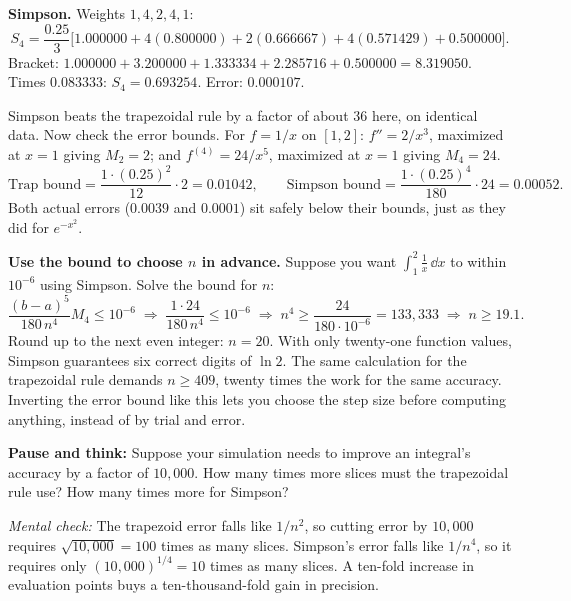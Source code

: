 \textbf{Simpson.} Weights $1,4,2,4,1$:
\[
S_4 = \frac{0.25}{3}\big[1.000000 + 4(0.800000) + 2(0.666667) + 4(0.571429) + 0.500000\big].
\]
Bracket: $1.000000 + 3.200000 + 1.333334 + 2.285716 + 0.500000 = 8.319050$. Times $0.083333$: $S_4 = 0.693254$. Error: $0.000107$.

Simpson beats the trapezoidal rule by a factor of about $36$ here, on identical data. Now check the error bounds. For $f = 1/x$ on $[1,2]$: $f'' = 2/x^3$, maximized at $x=1$ giving $M_2 = 2$; and $f^{(4)} = 24/x^5$, maximized at $x=1$ giving $M_4 = 24$.
\[
\text{Trap bound} = \frac{1\cdot(0.25)^2}{12}\cdot 2 = 0.01042,\qquad
\text{Simpson bound} = \frac{1\cdot(0.25)^4}{180}\cdot 24 = 0.00052.
\]
Both actual errors ($0.0039$ and $0.0001$) sit safely below their bounds, just as they did for $e^{-x^2}$.

\begin{labbox}
\textbf{Use the bound to choose $n$ in advance.} Suppose you want $\int_1^2 \tfrac1x\,\dd x$ to within $10^{-6}$ using Simpson. Solve the bound for $n$:
\[
\frac{(b-a)^5}{180\,n^4}M_4 \le 10^{-6}
\;\Longrightarrow\;
\frac{1\cdot 24}{180\,n^4} \le 10^{-6}
\;\Longrightarrow\;
n^4 \ge \frac{24}{180\cdot 10^{-6}} = 133{,}333
\;\Longrightarrow\;
n \ge 19.1.
\]
Round up to the next even integer: $n = 20$. With only twenty-one function values, Simpson guarantees six correct digits of $\ln 2$. The same calculation for the trapezoidal rule demands $n \ge 409$, twenty times the work for the same accuracy. Inverting the error bound like this lets you choose the step size before computing anything, instead of by trial and error.
\end{labbox}

\begin{recoverybox}
\textbf{Pause and think:} Suppose your simulation needs to improve an integral's accuracy by a factor of $10{,}000$. How many times more slices must the trapezoidal rule use? How many times more for Simpson?

\emph{Mental check:} The trapezoid error falls like $1/n^2$, so cutting error by $10{,}000$ requires $\sqrt{10{,}000} = 100$ times as many slices. Simpson's error falls like $1/n^4$, so it requires only $(10{,}000)^{1/4} = 10$ times as many slices. A ten-fold increase in evaluation points buys a ten-thousand-fold gain in precision.
\end{recoverybox}

